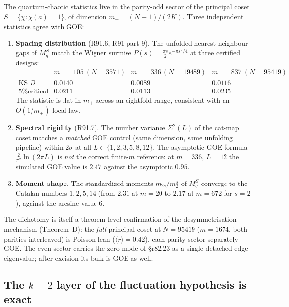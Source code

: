 \documentclass[11pt,reqno]{amsart}
\theoremstyle{definition}
\begin{document}
The quantum-chaotic statistics live in the parity-odd sector of the
principal coset $S = \{\chi : \chi(a) = 1\}$, of dimension
$m_+ = (N{-}1)/(2K)$.  Three independent statistics agree with GOE:

\begin{enumerate}
\item \textbf{Spacing distribution} (R91.6, R91 part 9).  The unfolded
nearest-neighbour gaps of $M_q^{S}$ match the Wigner surmise
$P(s) = \tfrac{\pi s}{2} e^{-\pi s^2/4}$ at three certified designs:
\[
\begin{array}{lccc}
 & m_+ = 105\ (N{=}3571) & m_+ = 336\ (N{=}19489) & m_+ = 837\ (N{=}95419)\\
\text{KS } D & 0.0140 & 0.0089 & 0.0116\\
\text{5\% critical} & 0.0211 & 0.0113 & 0.0235
\end{array}
\]
The statistic is flat in $m_+$ across an eightfold range, consistent with
an $O(1/m_+)$ local law.

\item \textbf{Spectral rigidity} (R91.7).  The number variance
$\Sigma^2(L)$ of the cat-map coset matches a \emph{matched} GOE control
(same dimension, same unfolding pipeline) within $2\sigma$ at all
$L \in \{1,2,3,5,8,12\}$.  The asymptotic GOE formula
$\tfrac{2}{\pi^2}\ln(2\pi L)$ is \emph{not} the correct finite-$m$
reference: at $m = 336$, $L = 12$ the simulated GOE value is $2.47$
against the asymptotic $0.95$.

\item \textbf{Moment shape}.  The standardized moments
$m_{2s}/m_2^s$ of $M_q^S$ converge to the Catalan numbers $1, 2, 5, 14$
(from $2.31$ at $m = 20$ to $2.17$ at $m = 672$ for $s = 2$), against the
arcsine value $6$.
\end{enumerate}

The dichotomy is itself a theorem-level confirmation of the
desymmetrisation mechanism (Theorem~D): the \emph{full} principal coset at
$N = 95419$ ($m = 1674$, both parities interleaved) is Poisson-lean
($\langle r\rangle = 0.42$), each parity sector separately GOE.  The
even sector carries the zero-mode of \S r82.23 as a single detached edge
eigenvalue; after excision its bulk is GOE as well.

\subsection{The $k=2$ layer of the fluctuation hypothesis is exact}
\label{sec:k2exact}
\end{document}
